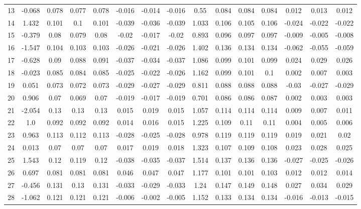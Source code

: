 \begin{table}[H]
{\begin{tabular}{l|c|ccc|ccc|c|ccc|ccc}
			13 & -0.068 & 0.078 & 0.077 & 0.078 & -0.016 & -0.014 & -0.016 & 0.55 & 0.084 & 0.084 & 0.084 & 0.012 & 0.013 & 0.012 \\
			14 & 1.432 & 0.101 & 0.1 & 0.101 & -0.039 & -0.036 & -0.039 & 1.033 & 0.106 & 0.105 & 0.106 & -0.024 & -0.022 & -0.022 \\
			15 & -0.379 & 0.08 & 0.079 & 0.08 & -0.02 & -0.017 & -0.02 & 0.893 & 0.096 & 0.097 & 0.097 & -0.009 & -0.005 & -0.008 \\
			16 & -1.547 & 0.104 & 0.103 & 0.103 & -0.026 & -0.021 & -0.026 & 1.402 & 0.136 & 0.134 & 0.134 & -0.062 & -0.055 & -0.059 \\
			17 & -0.628 & 0.09 & 0.088 & 0.091 & -0.037 & -0.034 & -0.037 & 1.086 & 0.099 & 0.101 & 0.099 & 0.024 & 0.029 & 0.026 \\
			18 & -0.023 & 0.085 & 0.084 & 0.085 & -0.025 & -0.022 & -0.026 & 1.162 & 0.099 & 0.101 & 0.1 & 0.002 & 0.007 & 0.003 \\
			19 & 0.051 & 0.073 & 0.072 & 0.073 & -0.029 & -0.027 & -0.029 & 0.811 & 0.088 & 0.088 & 0.088 & -0.03 & -0.027 & -0.029 \\
			20 & 0.906 & 0.07 & 0.069 & 0.07 & -0.019 & -0.017 & -0.019 & 0.701 & 0.086 & 0.086 & 0.087 & 0.002 & 0.003 & 0.003 \\
			21 & -2.054 & 0.13 & 0.13 & 0.13 & 0.015 & 0.019 & 0.015 & 1.057 & 0.114 & 0.114 & 0.114 & 0.009 & 0.007 & 0.011 \\
			22 & 1.0 & 0.092 & 0.092 & 0.092 & 0.014 & 0.016 & 0.015 & 1.225 & 0.109 & 0.11 & 0.11 & 0.004 & 0.005 & 0.006 \\
			23 & 0.963 & 0.113 & 0.112 & 0.113 & -0.028 & -0.025 & -0.028 & 0.978 & 0.119 & 0.119 & 0.119 & 0.019 & 0.021 & 0.02 \\
			24 & 0.013 & 0.07 & 0.07 & 0.07 & 0.017 & 0.019 & 0.018 & 1.323 & 0.107 & 0.109 & 0.108 & 0.023 & 0.028 & 0.025 \\
			25 & 1.543 & 0.12 & 0.119 & 0.12 & -0.038 & -0.035 & -0.037 & 1.514 & 0.137 & 0.136 & 0.136 & -0.027 & -0.025 & -0.026 \\
			26 & 0.697 & 0.081 & 0.081 & 0.081 & 0.046 & 0.047 & 0.047 & 1.177 & 0.101 & 0.101 & 0.103 & 0.012 & 0.012 & 0.014 \\
			27 & -0.456 & 0.131 & 0.13 & 0.131 & -0.033 & -0.029 & -0.033 & 1.24 & 0.147 & 0.149 & 0.148 & 0.027 & 0.034 & 0.029 \\
			28 & -1.062 & 0.121 & 0.121 & 0.121 & -0.006 & -0.002 & -0.005 & 1.152 & 0.133 & 0.134 & 0.134 & -0.016 & -0.013 & -0.015 \\

\end{tabular}}
\end{table}

